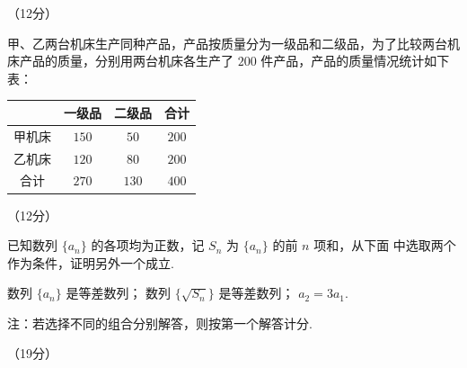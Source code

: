 \documentclass[a4paper,11pt]{report}
\begin{document}
\begin{examanswers}[start=17]

\item（12分）

甲、乙两台机床生产同种产品，产品按质量分为一级品和二级品，为了比较两台机床产品的质量，分别用两台机床各生产了 $200$ 件产品，产品的质量情况统计如下表：

\begin{tightcenter}
{\renewcommand{\arraystretch}{0.9}
\begin{tabular}{|c|c|c|c|}
\hline
& 一级品 & 二级品 & 合计 \\ \hline
甲机床 & $150$ & $50$ & $200$ \\ \hline
乙机床 & $120$ & $80$ & $200$ \\ \hline
合计 & $270$ & $130$ & $400$ \\ \hline
\end{tabular}}
\end{tightcenter}



\item（12分）

已知数列 $\{a_n\}$ 的各项均为正数，记 $S_n$ 为 $\{a_n\}$ 的前 $n$ 项和，从下面  中选取两个作为条件，证明另外一个成立.

 数列 $\{a_n\}$ 是等差数列； 数列 $\{\sqrt{S_n}\}$ 是等差数列； $a_2=3a_1$.

注：若选择不同的组合分别解答，则按第一个解答计分.

\item （19分）


\end{examanswers}
\end{document}
